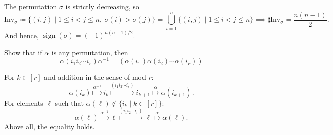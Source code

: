 \begin{solution}
    The permutation $\sigma$ is strictly decreasing, so
    \[
        \mathrm{Inv}_{\sigma}\coloneqq \{(i,j)\mid 1\leq i<j\leq n,\ \sigma(i)>\sigma(j) \}=\bigcup_{i=1}^{n}\{(i,j)\mid 1\leq i<j\leq n\}\implies\sharp\mathrm{Inv}_{\sigma}=\frac{n(n-1)}{2}.
    \]
    And hence, $\operatorname{sign}(\sigma)=(-1)^{n(n-1)/2}$.
\end{solution}

\setcounter{pb}{17}
\begin{problem}
    Show that if $ \alpha $ is any permutation, then
    \[
    \alpha (i_1 i_2 \cdots i_r) \alpha^{-1} = (\alpha (i_1) \alpha (i_2) \cdots \alpha (i_r))
    \]
\end{problem}

\begin{solution}
    For $k\in[r]$ and addition in the sense of mod $r$:
        \[
            \alpha(i_{k})
            \overset{\alpha^{-1}}{\longmapsto} i_{k}
            \overset{(i_1 i_2 \cdots i_r)}{\longmapsto} i_{k+1}
            \overset{\alpha}{\longmapsto} \alpha(i_{k+1}).
        \]
    For elements $\ell$ such that $\alpha(\ell)\notin\{i_{k}\mid k\in[r]\}$:
        \[
            \alpha(\ell)
            \overset{\alpha^{-1}}{\longmapsto} \ell
            \overset{(i_1 i_2 \cdots i_r)}{\longmapsto} \ell
            \overset{\alpha}{\longmapsto} \alpha(\ell).
        \]
    Above all, the equality holds.
\end{solution}

